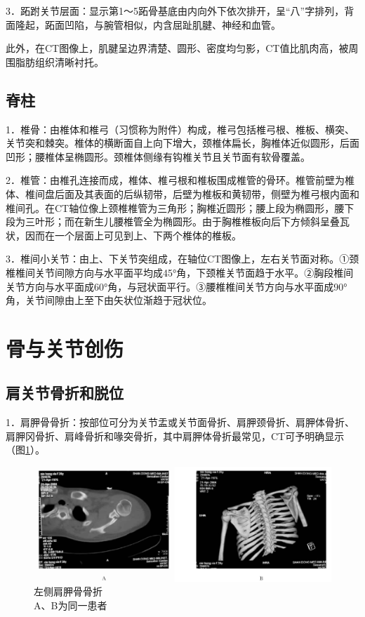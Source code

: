 3．跖跗关节层面：显示第1～5跖骨基底由内向外下依次排开，呈“八”字排列，背面隆起，跖面凹陷，与腕管相似，内含屈趾肌腱、神经和血管。

此外，在CT图像上，肌腱呈边界清楚、圆形、密度均匀影，CT值比肌肉高，被周围脂肪组织清晰衬托。

\subsection{脊柱}

1．椎骨：由椎体和椎弓（习惯称为附件）构成，椎弓包括椎弓根、椎板、横突、关节突和棘突。椎体的横断面自上向下增大，颈椎体扁长，胸椎体近似圆形，后面凹形；腰椎体呈椭圆形。颈椎体侧缘有钩椎关节且关节面有软骨覆盖。

2．椎管：由椎孔连接而成，椎体、椎弓根和椎板围成椎管的骨环。椎管前壁为椎体、椎间盘后面及其表面的后纵韧带，后壁为椎板和黄韧带，侧壁为椎弓根内面和椎间孔。在CT轴位像上颈椎椎管为三角形；胸椎近圆形；腰上段为椭圆形，腰下段为三叶形；而在新生儿腰椎管全为椭圆形。由于胸椎椎板向后下方倾斜呈叠瓦状，因而在一个层面上可见到上、下两个椎体的椎板。

3．椎间小关节：由上、下关节突组成，在轴位CT图像上，左右关节面对称。①颈椎椎间关节间隙方向与水平面平均成45°角，下颈椎关节面趋于水平。②胸段椎间关节方向与水平面成60°角，与冠状面平行。③腰椎椎间关节方向与水平面成90°角，关节间隙由上至下由矢状位渐趋于冠状位。

\section{骨与关节创伤}

\subsection{肩关节骨折和脱位}

1．肩胛骨骨折：按部位可分为关节盂或关节面骨折、肩胛颈骨折、肩胛体骨折、肩胛冈骨折、肩峰骨折和喙突骨折，其中肩胛体骨折最常见，CT可予明确显示（图\ref{fig22-3}）。

\begin{figure}[!htbp]
 \centering
 \includegraphics[width=.7\textwidth,height=\textheight,keepaspectratio]{./images/Image00419.jpg}
 \captionsetup{justification=centering}
 \caption{左侧肩胛骨骨折\\{\small A、B为同一患者}}
 \label{fig22-3}
  \end{figure} 


